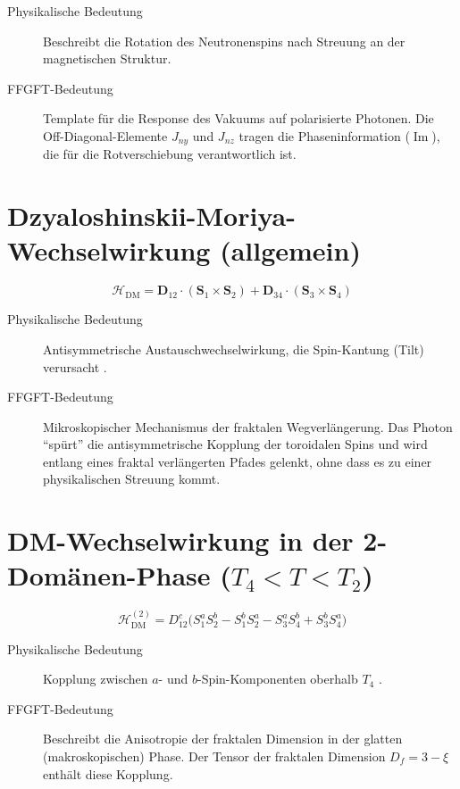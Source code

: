 \begin{description}
  \item[Physikalische Bedeutung] Beschreibt die Rotation des Neutronenspins
    nach Streuung an der magnetischen Struktur.
  \item[FFGFT-Bedeutung] Template für die Response des Vakuums auf polarisierte
    Photonen. Die Off-Diagonal-Elemente $J_{ny}$ und $J_{nz}$ tragen
    die Phaseninformation ($\operatorname{Im}$), die für die Rotverschiebung
    verantwortlich ist.
\end{description}

\section{Dzyaloshinskii-Moriya-Wechselwirkung (allgemein)}

\begin{equation}
  \mathcal{H}_{\mathrm{DM}} =
  \mathbf{D}_{12} \cdot (\mathbf{S}_1 \times \mathbf{S}_2)
  + \mathbf{D}_{34} \cdot (\mathbf{S}_3 \times \mathbf{S}_4)
  \label{eq:DM-general}
\end{equation}

\begin{description}
  \item[Physikalische Bedeutung] Antisymmetrische Austauschwechselwirkung,
    die Spin-Kantung (Tilt) verursacht \cite[Gl.~4]{Qureshi2026}.
  \item[FFGFT-Bedeutung] Mikroskopischer Mechanismus der fraktalen
    Wegverlängerung. Das Photon ``spürt'' die antisymmetrische Kopplung der
    toroidalen Spins und wird entlang eines fraktal verlängerten Pfades gelenkt,
    ohne dass es zu einer physikalischen Streuung kommt.
\end{description}

\section{DM-Wechselwirkung in der 2-Domänen-Phase \texorpdfstring{($T_4 < T < T_2$)}{}}

\begin{equation}
  \mathcal{H}_{\mathrm{DM}}^{(2)} =
  D_{12}^c \bigl(S_1^a S_2^b - S_1^b S_2^a - S_3^a S_4^b + S_3^b S_4^a\bigr)
  \label{eq:DM-2domain}
\end{equation}

\begin{description}
  \item[Physikalische Bedeutung] Kopplung zwischen $a$- und $b$-Spin-Komponenten
    oberhalb $T_4$ \cite[Gl.~5]{Qureshi2026}.
  \item[FFGFT-Bedeutung] Beschreibt die Anisotropie der fraktalen Dimension
    in der glatten (makroskopischen) Phase.
    Der Tensor der fraktalen Dimension $D_f = 3 - \xi$ enthält diese Kopplung.
\end{description}

